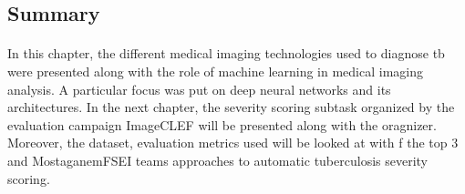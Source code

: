\subsection{Summary}
\paragraph{}
In this chapter, the different medical imaging technologies used to diagnose \acs{tb} were presented along with the role of machine learning in medical imaging analysis. A particular focus was put on deep neural networks and its architectures. In the next chapter, the severity scoring subtask organized by the evaluation campaign ImageCLEF will be presented along with the oragnizer. Moreover, the dataset, evaluation metrics used will be looked at with f the top 3 and MostaganemFSEI teams approaches to automatic tuberculosis severity scoring.